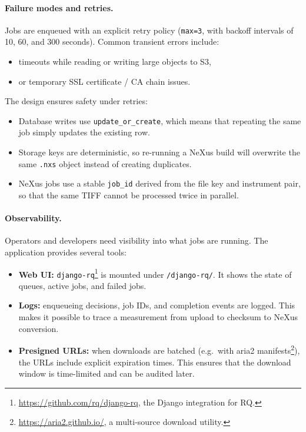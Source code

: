\paragraph{Failure modes and retries.}
Jobs are enqueued with an explicit retry policy (\texttt{max=3}, with backoff intervals of 10, 60, and 300 seconds).  
Common transient errors include:  
\begin{itemize}
	\item timeouts while reading or writing large objects to S3,  
	\item or temporary SSL certificate / CA chain issues.  
\end{itemize}

The design ensures safety under retries:  
\begin{itemize}
	\item Database writes use \texttt{update\_or\_create}, which means that repeating the same job simply updates the existing row.  
	\item Storage keys are deterministic, so re-running a NeXus build will overwrite the same \texttt{.nxs} object instead of creating duplicates.  
	\item NeXus jobs use a stable \texttt{job\_id} derived from the file key and instrument pair, 
	so that the same TIFF cannot be processed twice in parallel.  
\end{itemize}

\paragraph{Observability.}
Operators and developers need visibility into what jobs are running.  
The application provides several tools:  
\begin{itemize}
	\item \textbf{Web UI:} \texttt{django-rq}\footnote{\url{https://github.com/rq/django-rq}, the Django integration for RQ.} 
	is mounted under \texttt{/django-rq/}. It shows the state of queues, active jobs, and failed jobs.  
	\item \textbf{Logs:} enqueueing decisions, job IDs, and completion events are logged.  
	This makes it possible to trace a measurement from upload to checksum to NeXus conversion.  
	\item \textbf{Presigned URLs:} when downloads are batched (e.g.\ with aria2 manifests\footnote{\url{https://aria2.github.io/}, a multi-source download utility.}), 
	the URLs include explicit expiration times.  
	This ensures that the download window is time-limited and can be audited later.  
\end{itemize}

